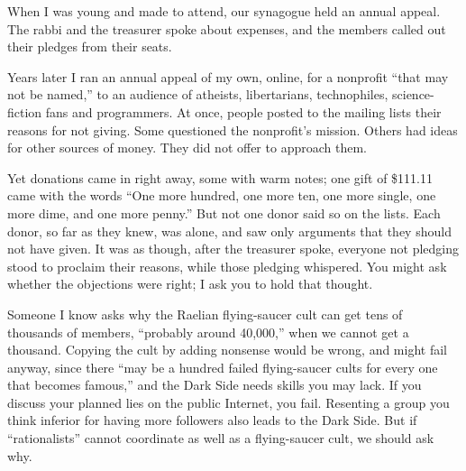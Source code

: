 
When I was young and made to attend, our synagogue held an annual appeal. The rabbi and the treasurer spoke about expenses, and the members called out their pledges from their seats.

Years later I ran an annual appeal of my own, online, for a nonprofit ``that may not be named,'' to an audience of atheists, libertarians, technophiles, science-fiction fans and programmers.  At once, people posted to the mailing lists their reasons for not giving. Some questioned the nonprofit's mission. Others had ideas for other sources of money. They did not offer to approach them.

Yet donations came in right away, some with warm notes; one gift of \$111.11 came with the words ``One more hundred, one more ten, one more single, one more dime, and one more penny.'' But not one donor said so on the lists. Each donor, so far as they knew, was alone, and saw only arguments that they should not have given. It was as though, after the treasurer spoke, everyone not pledging stood to proclaim their reasons, while those pledging whispered. You might ask whether the objections were right; I ask you to hold that thought.

Someone I know asks why the Raelian flying-saucer cult can get tens of thousands of members, ``probably around 40,000,'' when we cannot get a thousand.  Copying the cult by adding nonsense would be wrong, and might fail anyway, since there ``may be a hundred failed flying-saucer cults for every one that becomes famous,'' and the Dark Side needs skills you may lack. If you discuss your planned lies on the public Internet, you fail. Resenting a group you think inferior for having more followers also leads to the Dark Side. But if ``rationalists'' cannot coordinate as well as a flying-saucer cult, we should ask why.

